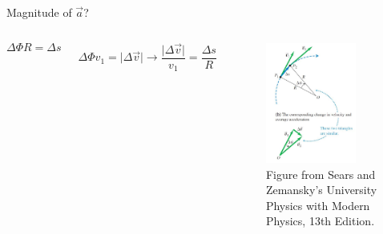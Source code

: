 \documentclass[]{beamer}
\begin{document}




\begin{frame}

    Magnitude of $\vec{a}$?
   
    \begin{columns}[c]
         \column{2.3in}  %
        
        


         \begin{equation*}
            \Delta \Phi R =\Delta s 
           \end{equation*}
           
         
            \begin{equation*}
            \Delta \Phi v_1 =\vert \Delta  \vec{v} \vert \rightarrow \frac{\vert\Delta \vec{v}\vert}{v_1} =\frac{\Delta s}{R}
           \end{equation*}
  

 
         \column{2.5in}
         
   
         \begin{figure}[h!]  
             \includegraphics[width=0.8\textwidth]{images/27.jpg}
             \caption{ {\tiny Figure from Sears and Zemansky's University Physics 
             with Modern Physics, 13th Edition.} }
           \end{figure}
           
           
           
            
      
         \end{columns}
 
     
       \end{frame}
\end{document}
